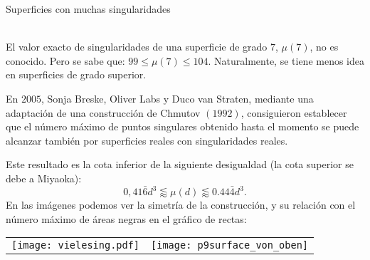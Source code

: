 \documentclass[es]{SurferDesc}%
\begin{document}
\footnotesize




\begin{surferPage}
  \begin{surferTitle}Superficies con muchas singularidades\end{surferTitle}   \\
    
    El valor exacto de singularidades de una superficie de grado $7$, $\mu(7)$, no es conocido.
    Pero se sabe que: $99\le \mu(7) \le 104$. Naturalmente, se tiene menos idea en superficies de grado superior.
    
    En $2005$, Sonja Breske, Oliver Labs y Duco van Straten, mediante una adaptación de 
    una construcción de Chmutov $(1992)$, consiguieron establecer que el número máximo de puntos singulares
    obtenido hasta el momento se puede alcanzar también por superficies reales con singularidades reales.
    
    Este resultado es la cota inferior de la siguiente desigualdad (la cota superior se debe a Miyaoka):
    \[0,41\bar{6}d^3 \lessapprox \mu(d) \lessapprox 0.44\bar{4} d^3.\]
     En las imágenes podemos ver la simetría de la construcción, y su relación
     con el número máximo de áreas negras en el gráfico de rectas:
    \begin{center}
      \begin{tabular}{c@{\qquad}c}
        \texttt{[image: vielesing.pdf]}
        &
        \texttt{[image: p9surface\_von\_oben]}
      \end{tabular}
    \end{center}

  \begin{surferText}
     \end{surferText}
\end{surferPage}
\end{document}

